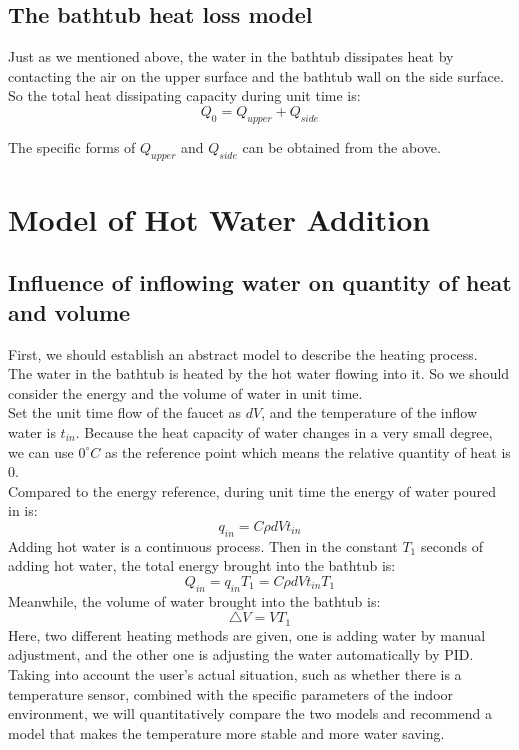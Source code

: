 \documentclass{mcmthesis}
\begin{document}
\subsection{The bathtub heat loss model} 	%

\indent Just as we mentioned above, the water in the bathtub dissipates heat by contacting the air on the upper surface and the bathtub wall on the side surface. \\

\indent So the total heat dissipating capacity during unit time is:
\begin{equation}
	Q_{0}=Q_{upper}+Q_{side}
\end{equation}


\indent The specific forms of $Q_{upper}$ and $Q_{side}$ can be obtained from the above. 

\section{Model of Hot Water Addition}
\subsection{Influence of inflowing water on quantity of heat and volume}
\indent First, we should establish an abstract model to describe the heating process.\\
\indent The water in the bathtub is heated by the hot water flowing into it. So we should consider the energy and the volume of water in unit time. \\
\indent Set the unit time flow of the faucet as $ dV $, and the temperature of the inflow water is $ t_{in}$. Because the  heat capacity of water changes in a very small degree, we can use $0^{\circ}C$ as the reference point which means the relative quantity of heat is 0.\\
\indent Compared to the energy reference, during unit time the energy of water poured in is:
\begin{equation}
	q_{in}=C\rho dVt_{in} 
\end{equation}
\indent Adding hot water is a continuous process. Then in the constant $ T_{1} $ seconds of adding hot water, the total energy brought into the bathtub is:
\begin{equation}
	Q_{in}=q_{in}T_{1}=C\rho dVt_{in}T_{1}
\end{equation}
\indent Meanwhile, the volume of water brought into the bathtub is:
\begin{equation}
	\bigtriangleup V=VT_{1} 
\end{equation}
\indent Here, two different heating methods are given, one is adding water by manual adjustment, and the other one is adjusting the water automatically by PID. Taking into account the user's actual situation, such as whether there is a temperature sensor, combined with the specific parameters of the indoor environment, we will quantitatively compare the two models and recommend a model that makes the temperature more stable and more water saving.\\
\end{document}

